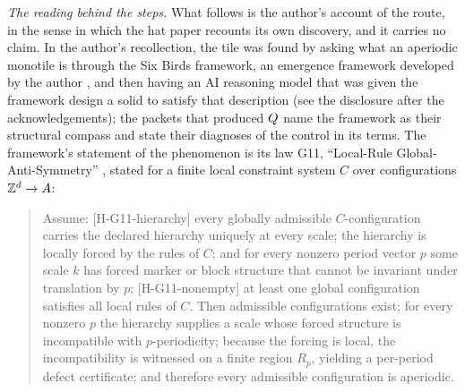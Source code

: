 \emph{The reading behind the steps.} What follows is the author's account of the route, in the
sense in which the hat paper recounts its own discovery, and it carries no claim. In the author's
recollection, the tile was found by asking what an aperiodic monotile is through the Six Birds
framework, an emergence framework developed by the author \cite{Tsi26F6,Tsi26F4,Tsi26NDO}, and
then having an AI reasoning model that was given the framework design a solid to satisfy that
description (see the disclosure after the acknowledgements); the packets that produced $Q$
name the framework as their structural
compass and state their diagnoses of the control in its terms. The framework's statement of the
phenomenon is its law G11, ``Local-Rule Global-Anti-Symmetry'' \cite{Tsi26F6}, stated for a finite
local constraint system $C$ over configurations $\mathbb{Z}^d\to A$:

\begin{quote}\small
Assume: [H-G11-hierarchy] every globally admissible $C$-configuration carries the declared
hierarchy uniquely at every scale; the hierarchy is locally forced by the rules of $C$; and for
every nonzero period vector $p$ some scale $k$ has forced marker or block structure that cannot be
invariant under translation by $p$; [H-G11-nonempty] at least one global configuration satisfies
all local rules of $C$. Then admissible configurations exist; for every nonzero $p$ the hierarchy
supplies a scale whose forced structure is incompatible with $p$-periodicity; because the forcing
is local, the incompatibility is witnessed on a finite region $R_p$, yielding a per-period defect
certificate; and therefore every admissible configuration is aperiodic.
\end{quote}

